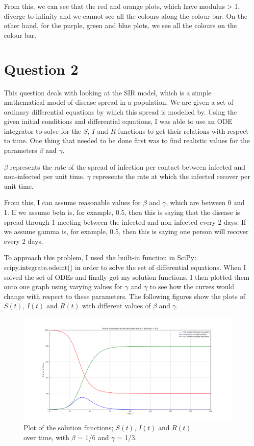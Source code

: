 \documentclass{article}
\begin{document}
From this, we can see that the red and orange plots, which have modulus > 1, diverge to infinity and we cannot see all the colours along the colour bar. On the other hand, for the purple, green and blue plots, we see all the colours on the colour bar.


\section*{Question 2}

This question deals with looking at the SIR model, which is a simple mathematical model of disease spread in a population. 
We are given a set of ordinary differential equations by which this spread is modelled by. 
Using the given initial conditions and differential equations, I was able to use an ODE integrator to solve for the $S$, $I$ and $R$ functions to get their relations with respect to time.
One thing that needed to be done first was to find realistic values for the parameters $\beta$ and $\gamma$. 

$\beta$ represents the rate of the spread of infection per contact between infected and non-infected per unit time.
$\gamma$ represents the rate at which the infected recover per unit time.

From this, I can assume reasonable values for $\beta$ and $\gamma$, which are between 0 and 1. 
If we assume beta is, for example, 0.5, then this is saying that the disease is spread through 1 meeting between the infected and non-infected every 2 days. 
If we assume gamma is, for example, 0.5, then this is saying one person will recover every 2 days.

\bigskip
To approach this problem, I used the built-in function in SciPy: scipy.integrate.odeint() in order to solve the set of differential equations.
When I solved the set of ODEs and finally got my solution functions, I then plotted them onto one graph using varying values for $\gamma$ and $\gamma$ to see how the curves would change with respect to these parameters.
The following figures show the plots of $S(t)$, $I(t)$ and $R(t)$ with different values of $\beta$ and $\gamma$.

\begin{figure}[!ht]
  \centering
  \includegraphics[width=1\linewidth]{Q2_plot1.png}
  \caption{Plot of the solution functions; $S(t)$, $I(t)$ and $R(t)$ \\ over time, with $\beta$ = 1/6 and $\gamma$ = 1/3.}
  \label{fig:Q2_plot1.png}
\end{figure}
\end{document}
